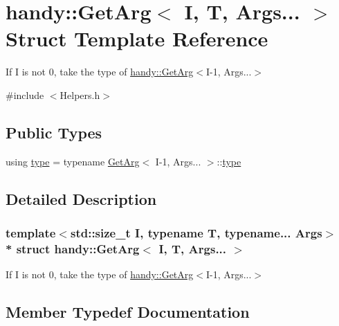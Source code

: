 \hypertarget{structhandy_1_1GetArg_3_01I_00_01T_00_01Args_8_8_8_01_4}{}\section{handy\+:\+:Get\+Arg$<$ I, T, Args... $>$ Struct Template Reference}
\label{structhandy_1_1GetArg_3_01I_00_01T_00_01Args_8_8_8_01_4}


If {\ttfamily I} is not 0, take the type of \hyperlink{structhandy_1_1GetArg}{handy\+::\+Get\+Arg}$<$I-\/1, Args...$>$  




{\ttfamily \#include $<$Helpers.\+h$>$}

\subsection*{Public Types}
\begin{DoxyCompactItemize}
\item 
using \hyperlink{structhandy_1_1GetArg_3_01I_00_01T_00_01Args_8_8_8_01_4_a58d88c2429703df5203c70ab307813ab}{type} = typename \hyperlink{structhandy_1_1GetArg}{Get\+Arg}$<$ I-\/1, Args... $>$\+::\hyperlink{structhandy_1_1GetArg_3_01I_00_01T_00_01Args_8_8_8_01_4_a58d88c2429703df5203c70ab307813ab}{type}
\end{DoxyCompactItemize}


\subsection{Detailed Description}
\subsubsection*{template$<$std\+::size\+\_\+t I, typename T, typename... Args$>$\\*
struct handy\+::\+Get\+Arg$<$ I, T, Args... $>$}

If {\ttfamily I} is not 0, take the type of \hyperlink{structhandy_1_1GetArg}{handy\+::\+Get\+Arg}$<$I-\/1, Args...$>$ 

\subsection{Member Typedef Documentation}

